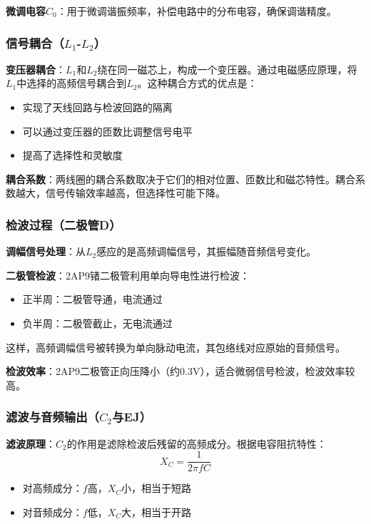 \documentclass[12pt,UTF8]{ctexbook}
\begin{document}
\textbf{微调电容$C_0$}：用于微调谐振频率，补偿电路中的分布电容，确保调谐精度。

\subsubsection{信号耦合（$L_1$-$L_2$）}

\textbf{变压器耦合}：$L_1$和$L_2$绕在同一磁芯上，构成一个变压器。通过电磁感应原理，将$L_1$中选择的高频信号耦合到$L_2$。这种耦合方式的优点是：\begin{itemize}
  \item 实现了天线回路与检波回路的隔离
  \item 可以通过变压器的匝数比调整信号电平
  \item 提高了选择性和灵敏度\end{itemize}

\textbf{耦合系数}：两线圈的耦合系数取决于它们的相对位置、匝数比和磁芯特性。耦合系数越大，信号传输效率越高，但选择性可能下降。

\subsubsection{检波过程（二极管D）}

\textbf{调幅信号处理}：从$L_2$感应的是高频调幅信号，其振幅随音频信号变化。

\textbf{二极管检波}：2AP9锗二极管利用单向导电性进行检波：\begin{itemize}
  \item 正半周：二极管导通，电流通过
  \item 负半周：二极管截止，无电流通过\end{itemize}

这样，高频调幅信号被转换为单向脉动电流，其包络线对应原始的音频信号。

\textbf{检波效率}：2AP9二极管正向压降小（约0.3V），适合微弱信号检波，检波效率较高。

\subsubsection{滤波与音频输出（$C_2$与EJ）}

\textbf{滤波原理}：$C_2$的作用是滤除检波后残留的高频成分。根据电容阻抗特性：
\[ X_C = \frac{1}{2\pi fC} \]
\begin{itemize}
  \item 对高频成分：$f$高，$X_C$小，相当于短路
  \item 对音频成分：$f$低，$X_C$大，相当于开路\end{itemize}
\end{document}
